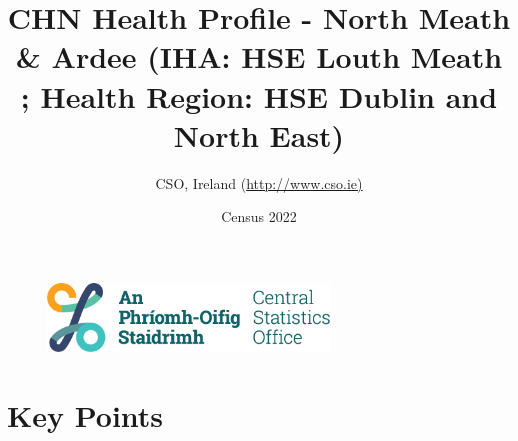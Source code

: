 \documentclass{article}
\title{CHN Health Profile - North Meath & Ardee (IHA: HSE Louth Meath ;  Health Region: HSE Dublin and North East) }
\date{Census 2022}
\author{CSO, Ireland  (\url{http://www.cso.ie)}}
\begin{document}


\begin{figure}
	\centering
\includegraphics[width =75mm]{../figures/CSO_Logo.png}
\end{figure}

				 
		   
						  
														  
																																													
												 
			 
\maketitle
					
													   
				 
						 
																																																																											   
				 
				  
  \pagebreak
    	    \tableofcontents

\pagebreak


\section{Key Points}
\end{document}

